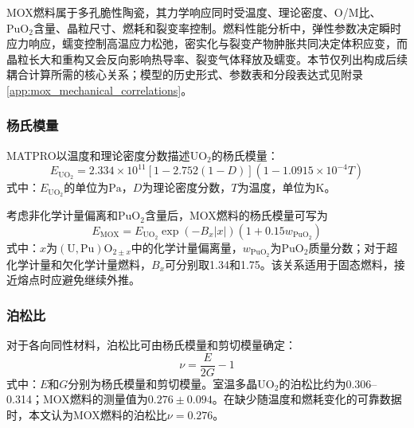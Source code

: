 \label{sec:mox_mechanical_properties}

MOX燃料属于多孔脆性陶瓷，其力学响应同时受温度、理论密度、O/M比、$\mathrm{PuO}_2$含量、晶粒尺寸、燃耗和裂变率控制。燃料性能分析中，弹性参数决定瞬时应力响应，蠕变控制高温应力松弛，密实化与裂变产物肿胀共同决定体积应变，而晶粒长大和重构又会反向影响热导率、裂变气体释放及蠕变。本节仅列出构成后续耦合计算所需的核心关系；模型的历史形式、参数表和分段表达式见附录\ref{app:mox_mechanical_correlations}。


\subsubsection{杨氏模量}

MATPRO以温度和理论密度分数描述$\mathrm{UO}_2$的杨氏模量：
\begin{equation}
	E_{\mathrm{UO}_2}
	=2.334\times10^{11}
	\left[1-2.752(1-D)\right]
	\left(1-1.0915\times10^{-4}T\right)
	\label{eq:uo2_youngs_modulus}
\end{equation}
式中：$E_{\mathrm{UO}_2}$的单位为$\mathrm{Pa}$，$D$为理论密度分数，$T$为温度，单位为$\mathrm{K}$。

考虑非化学计量偏离和$\mathrm{PuO}_2$含量后，MOX燃料的杨氏模量可写为
\begin{equation}
	E_{\mathrm{MOX}}
	=E_{\mathrm{UO}_2}\exp(-B_x|x|)
	\left(1+0.15w_{\mathrm{PuO}_2}\right)
	\label{eq:mox_youngs_modulus}
\end{equation}
式中：$x$为$(\mathrm{U},\mathrm{Pu})\mathrm{O}_{2\pm x}$中的化学计量偏离量，$w_{\mathrm{PuO}_2}$为$\mathrm{PuO}_2$质量分数；对于超化学计量和欠化学计量燃料，$B_x$可分别取1.34和1.75。该关系适用于固态燃料，接近熔点时应避免继续外推。

\subsubsection{泊松比}

对于各向同性材料，泊松比可由杨氏模量和剪切模量确定：
\begin{equation}
	\nu=\frac{E}{2G}-1
	\label{eq:mox_poisson_ratio}
\end{equation}
式中：$E$和$G$分别为杨氏模量和剪切模量。室温多晶$\mathrm{UO}_2$的泊松比约为0.306--0.314；MOX燃料的测量值为$0.276\pm0.094$。在缺少随温度和燃耗变化的可靠数据时，本文认为MOX燃料的泊松比$\nu=0.276$。


